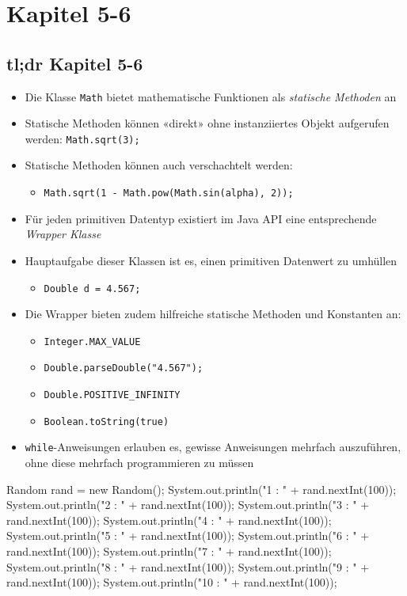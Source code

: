 \documentclass[a4paper,10pt, dvipsnames]{report}
\begin{document}
\chapter{Kapitel 5-6}
\section{tl;dr Kapitel 5-6}

\begin{itemize}
    \item Die Klasse \texttt{Math} bietet mathematische Funktionen als \textit{statische Methoden} an
    \item Statische Methoden können «direkt» ohne instanziiertes Objekt aufgerufen werden: \texttt{Math.sqrt(3);}
    \item Statische Methoden können auch verschachtelt werden:
    \begin{itemize}
        \item \texttt{Math.sqrt(1 - Math.pow(Math.sin(alpha), 2));}
    \end{itemize}
    \item Für jeden primitiven Datentyp existiert im Java API eine entsprechende \textit{Wrapper Klasse}
    \item Hauptaufgabe dieser Klassen ist es, einen primitiven Datenwert zu umhüllen
    \begin{itemize}
        \item \texttt{Double d = 4.567;}
    \end{itemize}
    \item Die Wrapper bieten zudem hilfreiche statische Methoden und Konstanten an:
    \begin{itemize}
        \item \texttt{Integer.MAX_VALUE}
        \item \texttt{Double.parseDouble("4.567");}
        \item \texttt{Double.POSITIVE_INFINITY}
        \item \texttt{Boolean.toString(true)}
    \end{itemize}
    \item \texttt{while}-Anweisungen erlauben es, gewisse Anweisungen mehrfach auszuführen, ohne diese mehrfach programmieren zu müssen
\end{itemize}

\begin{javacodebox}
    Random rand = new Random();
    System.out.println("1 : " + rand.nextInt(100));
    System.out.println("2 : " + rand.nextInt(100));
    System.out.println("3 : " + rand.nextInt(100));
    System.out.println("4 : " + rand.nextInt(100));
    System.out.println("5 : " + rand.nextInt(100));
    System.out.println("6 : " + rand.nextInt(100));
    System.out.println("7 : " + rand.nextInt(100));
    System.out.println("8 : " + rand.nextInt(100));
    System.out.println("9 : " + rand.nextInt(100));
    System.out.println("10 : " + rand.nextInt(100));
\end{javacodebox}
\end{document}
